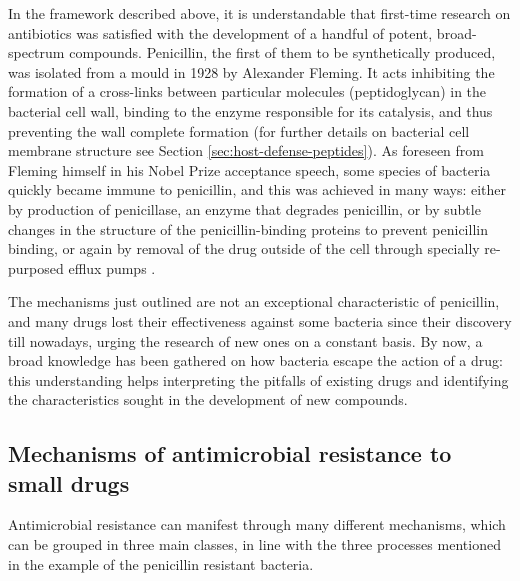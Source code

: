 In the framework described above, it is understandable that first-time research on antibiotics was satisfied with the development of a handful of potent, broad-spectrum compounds.
%
Penicillin, the first of them to be synthetically produced, was isolated from a mould in 1928 by Alexander Fleming. It acts inhibiting the formation of a cross-links between particular molecules (peptidoglycan) in the bacterial cell wall, binding to the enzyme responsible for its catalysis, and thus preventing the wall complete formation \citep{Gordon2000} (for further details on bacterial cell membrane structure see Section \ref{sec:host-defense-peptides}).
%
As foreseen from Fleming himself in his Nobel Prize acceptance speech, some species of bacteria quickly became immune to penicillin, and this was achieved in many ways: either by production of penicillase, an enzyme that degrades penicillin, or by subtle changes in the structure of the penicillin-binding proteins to prevent penicillin binding, or again by removal of the drug outside of the cell through specially re-purposed efflux pumps \citep{Lobanovska2017}.

The mechanisms just outlined are not an exceptional characteristic of penicillin, and many drugs lost their effectiveness against some bacteria since their discovery till nowadays, urging the research of new ones on a constant basis. By now, a broad knowledge has been gathered on how bacteria escape the action of a drug: this understanding helps interpreting the pitfalls of existing drugs and identifying the characteristics sought in the development of new compounds.


\subsection{Mechanisms of antimicrobial resistance to small drugs} \label{sec:AMR_mechs}
Antimicrobial resistance can manifest through many different mechanisms, which can be grouped in three main classes, in line with the three processes mentioned in the example of the penicillin resistant bacteria.

